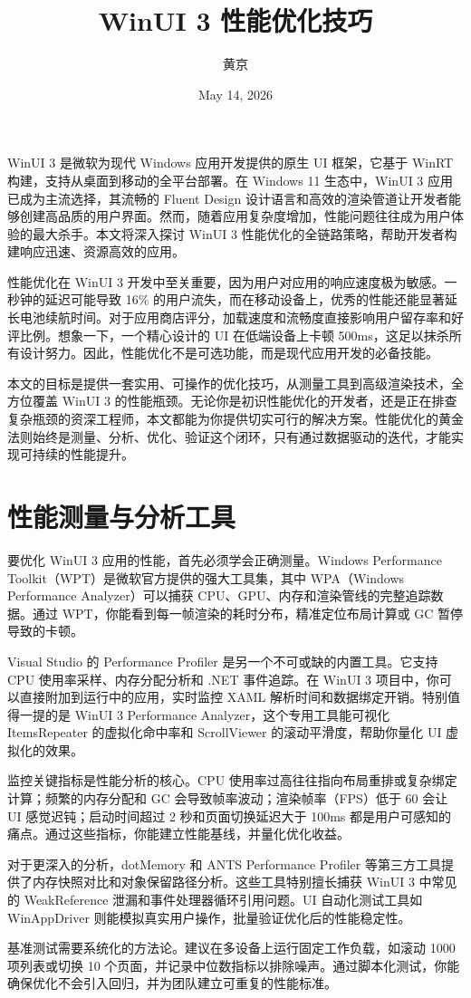 \title{WinUI 3 性能优化技巧}
\author{黄京}
\date{May 14, 2026}
\maketitle
WinUI 3 是微软为现代 Windows 应用开发提供的原生 UI 框架，它基于 WinRT 构建，支持从桌面到移动的全平台部署。在 Windows 11 生态中，WinUI 3 应用已成为主流选择，其流畅的 Fluent Design 设计语言和高效的渲染管道让开发者能够创建高品质的用户界面。然而，随着应用复杂度增加，性能问题往往成为用户体验的最大杀手。本文将深入探讨 WinUI 3 性能优化的全链路策略，帮助开发者构建响应迅速、资源高效的应用。\par
性能优化在 WinUI 3 开发中至关重要，因为用户对应用的响应速度极为敏感。一秒钟的延迟可能导致 16\%{} 的用户流失，而在移动设备上，优秀的性能还能显著延长电池续航时间。对于应用商店评分，加载速度和流畅度直接影响用户留存率和好评比例。想象一下，一个精心设计的 UI 在低端设备上卡顿 500ms，这足以抹杀所有设计努力。因此，性能优化不是可选功能，而是现代应用开发的必备技能。\par
本文的目标是提供一套实用、可操作的优化技巧，从测量工具到高级渲染技术，全方位覆盖 WinUI 3 的性能瓶颈。无论你是初识性能优化的开发者，还是正在排查复杂瓶颈的资深工程师，本文都能为你提供切实可行的解决方案。性能优化的黄金法则始终是测量、分析、优化、验证这个闭环，只有通过数据驱动的迭代，才能实现可持续的性能提升。\par
\chapter{性能测量与分析工具}
要优化 WinUI 3 应用的性能，首先必须学会正确测量。Windows Performance Toolkit（WPT）是微软官方提供的强大工具集，其中 WPA（Windows Performance Analyzer）可以捕获 CPU、GPU、内存和渲染管线的完整追踪数据。通过 WPT，你能看到每一帧渲染的耗时分布，精准定位布局计算或 GC 暂停导致的卡顿。\par
Visual Studio 的 Performance Profiler 是另一个不可或缺的内置工具。它支持 CPU 使用率采样、内存分配分析和 .NET 事件追踪。在 WinUI 3 项目中，你可以直接附加到运行中的应用，实时监控 XAML 解析时间和数据绑定开销。特别值得一提的是 WinUI 3 Performance Analyzer，这个专用工具能可视化 ItemsRepeater 的虚拟化命中率和 ScrollViewer 的滚动平滑度，帮助你量化 UI 虚拟化的效果。\par
监控关键指标是性能分析的核心。CPU 使用率过高往往指向布局重排或复杂绑定计算；频繁的内存分配和 GC 会导致帧率波动；渲染帧率（FPS）低于 60 会让 UI 感觉迟钝；启动时间超过 2 秒和页面切换延迟大于 100ms 都是用户可感知的痛点。通过这些指标，你能建立性能基线，并量化优化收益。\par
对于更深入的分析，dotMemory 和 ANTS Performance Profiler 等第三方工具提供了内存快照对比和对象保留路径分析。这些工具特别擅长捕获 WinUI 3 中常见的 WeakReference 泄漏和事件处理器循环引用问题。UI 自动化测试工具如 WinAppDriver 则能模拟真实用户操作，批量验证优化后的性能稳定性。\par
基准测试需要系统化的方法论。建议在多设备上运行固定工作负载，如滚动 1000 项列表或切换 10 个页面，并记录中位数指标以排除噪声。通过脚本化测试，你能确保优化不会引入回归，并为团队建立可重复的性能标准。\par
